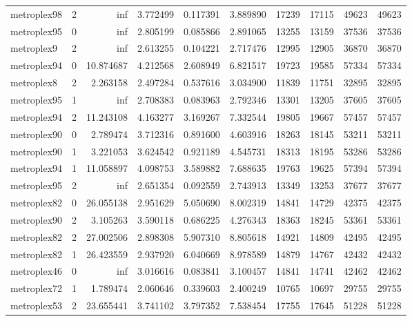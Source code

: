 \begin{longtable}{|l|r|r|r|r|r|r|r|r|r|}
metroplex98 & 2 & inf & 3.772499 & 0.117391 & 3.889890 & 17239 & 17115 & 49623 & 49623 \\
metroplex95 & 0 & inf & 2.805199 & 0.085866 & 2.891065 & 13255 & 13159 & 37536 & 37536 \\
metroplex9 & 2 & inf & 2.613255 & 0.104221 & 2.717476 & 12995 & 12905 & 36870 & 36870 \\
metroplex94 & 0 & 10.874687 & 4.212568 & 2.608949 & 6.821517 & 19723 & 19585 & 57334 & 57334 \\
metroplex8 & 2 & 2.263158 & 2.497284 & 0.537616 & 3.034900 & 11839 & 11751 & 32895 & 32895 \\
metroplex95 & 1 & inf & 2.708383 & 0.083963 & 2.792346 & 13301 & 13205 & 37605 & 37605 \\
metroplex94 & 2 & 11.243108 & 4.163277 & 3.169267 & 7.332544 & 19805 & 19667 & 57457 & 57457 \\
metroplex90 & 0 & 2.789474 & 3.712316 & 0.891600 & 4.603916 & 18263 & 18145 & 53211 & 53211 \\
metroplex90 & 1 & 3.221053 & 3.624542 & 0.921189 & 4.545731 & 18313 & 18195 & 53286 & 53286 \\
metroplex94 & 1 & 11.058897 & 4.098753 & 3.589882 & 7.688635 & 19763 & 19625 & 57394 & 57394 \\
metroplex95 & 2 & inf & 2.651354 & 0.092559 & 2.743913 & 13349 & 13253 & 37677 & 37677 \\
metroplex82 & 0 & 26.055138 & 2.951629 & 5.050690 & 8.002319 & 14841 & 14729 & 42375 & 42375 \\
metroplex90 & 2 & 3.105263 & 3.590118 & 0.686225 & 4.276343 & 18363 & 18245 & 53361 & 53361 \\
metroplex82 & 2 & 27.002506 & 2.898308 & 5.907310 & 8.805618 & 14921 & 14809 & 42495 & 42495 \\
metroplex82 & 1 & 26.423559 & 2.937920 & 6.040669 & 8.978589 & 14879 & 14767 & 42432 & 42432 \\
metroplex46 & 0 & inf & 3.016616 & 0.083841 & 3.100457 & 14841 & 14741 & 42462 & 42462 \\
metroplex72 & 1 & 1.789474 & 2.060646 & 0.339603 & 2.400249 & 10765 & 10697 & 29755 & 29755 \\
metroplex53 & 2 & 23.655441 & 3.741102 & 3.797352 & 7.538454 & 17755 & 17645 & 51228 & 51228 \\
\end{longtable}

